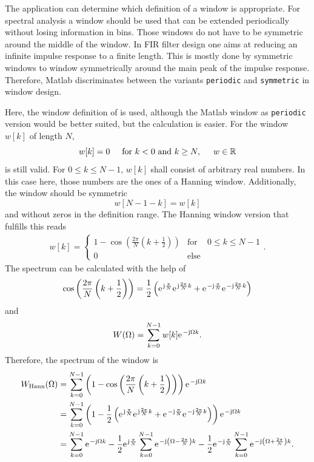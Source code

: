\documentclass[11pt,a4paper,DIV=12]{scrartcl}
\begin{document}
The application can determine which definition of a window is appropriate.
%
For spectral analysis a window should be used that can be extended periodically
without losing information in bins.
%
Those windows do not have to be symmetric around the middle of the window.
%
In FIR filter design one aims at reducing an infinite impulse response to a
finite length.
%
This is mostly done by symmetric windows to window symmetrically around the main
peak of the impulse response.
%
Therefore, Matlab discriminates between the variants \texttt{periodic} and
\texttt{symmetric} in window design.

Here, the window definition of \cite{Moeser2011} is used, although the Matlab
window as \texttt{periodic} version would be better suited, but the calculation
is easier.
%
For the window $w[k]$ of length $N$,
%
\begin{equation}
w[k]=0 \hspace{5mm} \text{for}\,\,k<0\,\,\text{and}\,\,k\geq N,
\hspace{5mm} w\in\mathbb{R}
\end{equation}
%
is still valid.
%
For $0\leq k\leq N-1$, $w[k]$ shall consist of arbitrary real numbers.
%
In this case here, those numbers are the ones of a Hanning window.
%
Additionally, the window should be symmetric
%
\begin{equation}
w[N-1-k]=w[k]
\end{equation}
%
and without zeros in the definition range.
%
The Hanning window version that fulfills this reads
%
\begin{align}
w[k]=\left\{\begin{matrix}1-\cos\left(\frac{2\pi}{N}\left(k+\frac{1}{2}\right)\right) & \text{for} & 0\leq k\leq N-1\\0 & \text{else} & \end{matrix}\right..
\label{eq:hanning}
\end{align}
%
The spectrum can be calculated with the help of
\begin{equation}
\cos\left(\frac{2\pi}{N}\left(k+\frac{1}{2}\right)\right)=\frac{1}{2}\left(\e^{\im\frac{\pi}{N}}\e^{\im\frac{2\pi}{N}k}+\e^{-\im\frac{\pi}{N}}\e^{-\im\frac{2\pi}{N}k}\right)
\end{equation}
%
and
%
\begin{equation}
W(\Omega)=\sum\limits_{k=0}^{N-1}w[k]\e^{-\im\Omega k}.
\end{equation}
%
Therefore, the spectrum of the window is
%
\begin{align}
W_{\text{Hann}}(\Omega)&=\sum\limits_{k=0}^{N-1}\left(1-\cos\left(\frac{2\pi}{N}\left(k+\frac{1}{2}\right)\right)\right)\e^{-\im\Omega k}\\
&=\sum\limits_{k=0}^{N-1}\left(1-\frac{1}{2}\left(\e^{\im\frac{\pi}{N}}\e^{\im\frac{2\pi}{N}k}+\e^{-\im\frac{\pi}{N}}\e^{-\im\frac{2\pi}{N}k}\right)\right)\e^{-\im\Omega k}\\
&=\sum\limits_{k=0}^{N-1}\e^{-\im\Omega k}-\frac{1}{2}\e^{\im\frac{\pi}{N}}\sum\limits_{k=0}^{N-1}\e^{-\im\left(\Omega-\frac{2\pi}{N}\right)k}-\frac{1}{2}\e^{-\im\frac{\pi}{N}}\sum\limits_{k=0}^{N-1}\e^{-\im\left(\Omega+\frac{2\pi}{N}\right)k}.
\end{align}
\end{document}
